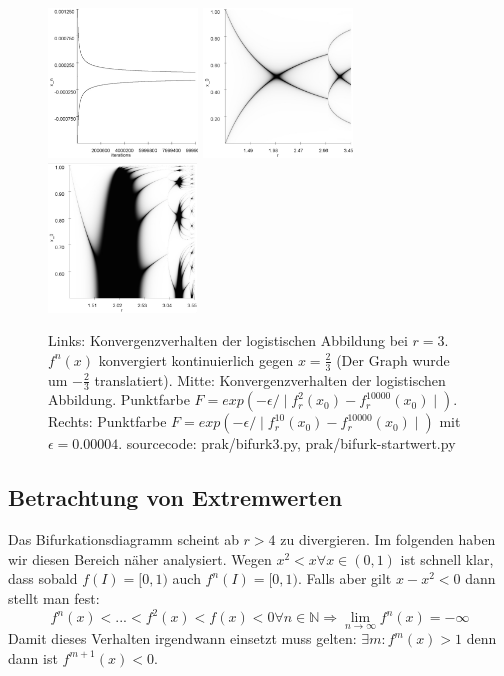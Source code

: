 \documentclass[12pt,a4paper]{article}
\begin{document}
\begin{figure}
\centering
\includegraphics[height=150px]{bifurkpunkt}
\includegraphics[height=150px]{startwert/e0008n2}
\includegraphics[height=150px]{startwert/zoomed10}
\caption{Links: Konvergenzverhalten der logistischen Abbildung bei $r=3$. $f^n(x)$ konvergiert kontinuierlich gegen $x=\frac{2}{3}$ (Der Graph wurde um $-\frac{2}{3}$ translatiert). Mitte: Konvergenzverhalten der logistischen Abbildung. Punktfarbe $F=exp(-\epsilon / \mid f^{2}_r(x_0)-f^{10000}_r(x_0) \mid)$. Rechts: Punktfarbe $F=exp(-\epsilon / \mid f^{10}_r(x_0)-f^{10000}_r(x_0) \mid)$ mit $\epsilon=0.00004$. sourcecode: prak/bifurk3.py, prak/bifurk-startwert.py}
\label{fig:log-konv1}
\end{figure}
\subsection{Betrachtung von Extremwerten}
Das Bifurkationsdiagramm scheint ab $r>4$ zu divergieren. Im folgenden haben wir diesen Bereich näher analysiert. 
Wegen  $x^2 < x \forall x \in (0,1)$ ist schnell klar, dass sobald $f(I) = [0,1)$ auch $f^n(I) = [0, 1)$. 
Falls aber gilt $x-x^2 < 0$ dann stellt man fest:
\begin{equation}
f^n(x) < ... < f^{2}(x) < f(x) < 0 \forall n \in \mathbb{N} \Rightarrow \lim_{n \rightarrow \infty} f^n(x) = -\infty
\end{equation}
Damit dieses Verhalten irgendwann einsetzt muss gelten: $\exists m: f^m(x) > 1$ denn dann ist $f^{m+1}(x) < 0$. 
\end{document}
